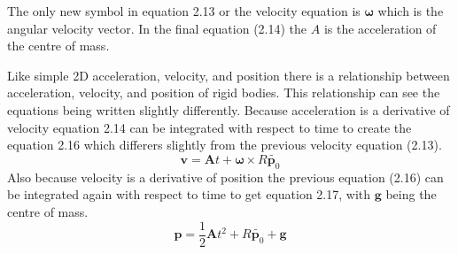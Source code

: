 The only new symbol in equation 2.13 or the velocity equation is $\boldsymbol{\omega}$ which is the angular velocity vector. In the final equation (2.14) the $A$ is the acceleration of the centre of mass.

Like simple 2D acceleration, velocity, and position there is a relationship between acceleration, velocity, and position of rigid bodies. This relationship can see the equations being written slightly differently.
Because acceleration is a derivative of velocity equation 2.14 can be integrated with respect to time to create the equation 2.16 which differers slightly from the previous velocity equation (2.13).
\begin{equation}
\mathbf{v}=\mathbf{A}t+\boldsymbol\omega\times{R}\tilde{\mathbf{p}_{0}}
\end{equation}
Also because velocity is a derivative of position the previous equation (2.16) can be integrated again with respect to time to get equation 2.17, with $\mathbf{g}$ being the centre of mass.
\begin{equation}
\mathbf{p}=\frac{1}{2}\mathbf{A}t^{2}+{R}\tilde{\mathbf{p}_{0}}+\mathbf{g}
\end{equation}